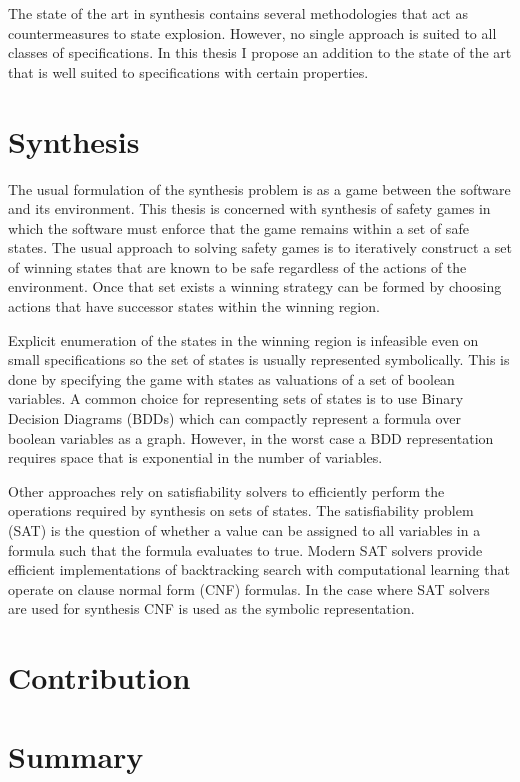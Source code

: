 The state of the art in synthesis contains several methodologies that act as countermeasures to state explosion. However, no single approach is suited to all classes of specifications. In this thesis I propose an addition to the state of the art that is well suited to specifications with certain properties.

\section{Synthesis}

The usual formulation of the synthesis problem is as a game between the software and its environment. This thesis is concerned with synthesis of safety games in which the software must enforce that the game remains within a set of safe states. The usual approach to solving safety games is to iteratively construct a set of winning states that are known to be safe regardless of the actions of the environment. Once that set exists a winning strategy can be formed by choosing actions that have successor states within the winning region.

Explicit enumeration of the states in the winning region is infeasible even on small specifications so the set of states is usually represented symbolically. This is done by specifying the game with states as valuations of a set of boolean variables. A common choice for representing sets of states is to use Binary Decision Diagrams (BDDs) which can compactly represent a formula over boolean variables as a graph. However, in the worst case a BDD representation requires space that is exponential in the number of variables.

Other approaches rely on satisfiability solvers to efficiently perform the operations required by synthesis on sets of states. The satisfiability problem (SAT) is the question of whether a value can be assigned to all variables in a formula such that the formula evaluates to true. Modern SAT solvers provide efficient implementations of backtracking search with computational learning that operate on clause normal form (CNF) formulas. In the case where SAT solvers are used for synthesis CNF is used as the symbolic representation. 

\section{Contribution}


\section{Summary}

